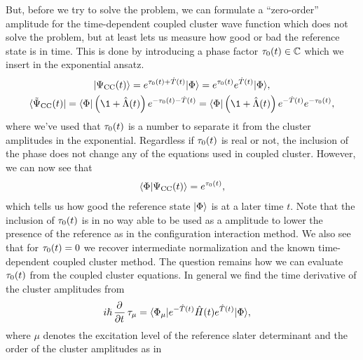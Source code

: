             But, before we try to solve the problem, we can formulate a
            ``zero-order'' amplitude for the time-dependent coupled cluster wave
            function which does not solve the problem, but at least lets us
            measure how good or bad the reference state is in time.
            This is done by introducing a phase factor $\tau_0(t) \in
            \mathbb{C}$ which we insert in the exponential ansatz.
            \begin{gather}
                \ket{\cc(t)}
                = e^{\clustamp_0(t) + \clust(t)}\ketslat
                = e^{\clustamp_0(t)} e^{\clust(t)}\ketslat,
                \\
                \bra{\bicc(t)}
                = \braslat\para{\1 + \clustl(t)}
                e^{-\clustamp_0(t) - \clust(t)}
                = \braslat\para{\1 + \clustl(t)}
                e^{-\clust(t)} e^{-\clustamp_0(t)},
            \end{gather}
            where we've used that $\tau_0(t)$ is a number to separate it
            from the cluster amplitudes in the exponential.
            Regardless if $\tau_0(t)$ is real or not, the inclusion of the
            phase does not change any of the equations used in coupled cluster.
            However, we can now see that
            \begin{align}
                \langle \Phi | \Psi_{\text{CC}}(t) \rangle = e^{\tau_0(t)},
            \end{align}
            which tells us how good the reference state $| \Phi \rangle$ is at a later
            time $t$.
            Note that the inclusion of $\tau_0(t)$ is in no way able to be
            used as a amplitude to lower the presence of the reference as in the
            configuration interaction method.
            We also see that for $\tau_0(t) = 0$ we recover intermediate
            normalization and the known time-dependent coupled cluster method.
            The question remains how we can evaluate $\tau_0(t)$ from the
            coupled cluster equations.
            In general we find the time derivative of the cluster amplitudes
            from
            \begin{align}
                i\hslash \dpd[]{}{t}\clustamp_{\mu}
                &=
                \bra{\slat_{\mu}} e^{-\clust(t)} \hamil(t) e^{\clust(t)}
                \ketslat,
            \end{align}
            where $\mu$ denotes the excitation level of the reference slater
            determinant and the order of the cluster amplitudes as in
